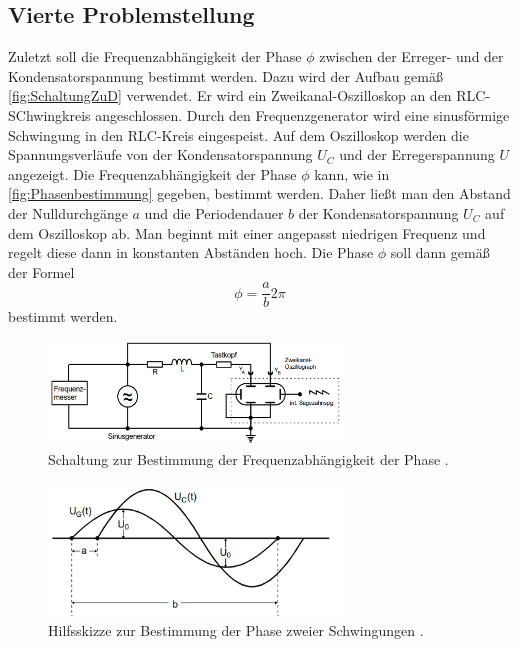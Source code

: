 \subsection{Vierte Problemstellung}
Zuletzt soll die Frequenzabhängigkeit der Phase $\phi$ zwischen der Erreger- und der Kondensatorspannung bestimmt werden. Dazu wird der Aufbau gemäß \autoref{fig:SchaltungZuD} verwendet.
Er wird ein Zweikanal-Oszilloskop an den RLC-SChwingkreis angeschlossen. Durch den Frequenzgenerator wird eine sinusförmige Schwingung in den RLC-Kreis eingespeist.
Auf dem Oszilloskop werden die Spannungsverläufe von der Kondensatorspannung $U_{C}$ und der Erregerspannung $U$ angezeigt. Die Frequenzabhängigkeit der Phase $\phi$ kann, wie 
in \autoref{fig:Phasenbestimmung} gegeben, bestimmt werden. Daher ließt man den Abstand der Nulldurchgänge $a$ und die Periodendauer $b$ der Kondensatorspannung $U_{C}$ auf dem 
Oszilloskop ab. Man beginnt mit einer angepasst niedrigen Frequenz und regelt diese dann in konstanten Abständen hoch. Die Phase $\phi$ soll dann gemäß der Formel 
\begin{equation}
    \label{eqn:Phase}
    \phi = \frac{a}{b}2\pi 
\end{equation}
bestimmt werden.
\begin{figure}
    \centering
    \includegraphics[width=0.7\textwidth]{content/SchaltungZuD.pdf}
    \caption{Schaltung zur Bestimmung der Frequenzabhängigkeit der Phase \cite{v354}.}    
    \label{fig:SchaltungZuD}
\end{figure}
\begin{figure}
    \centering
    \includegraphics[width=0.7\textwidth]{content/Phasenbestimmung.pdf}
    \caption{Hilfsskizze zur Bestimmung der Phase zweier Schwingungen \cite{v353}.}    
    \label{fig:Phasenbestimmung}
\end{figure}